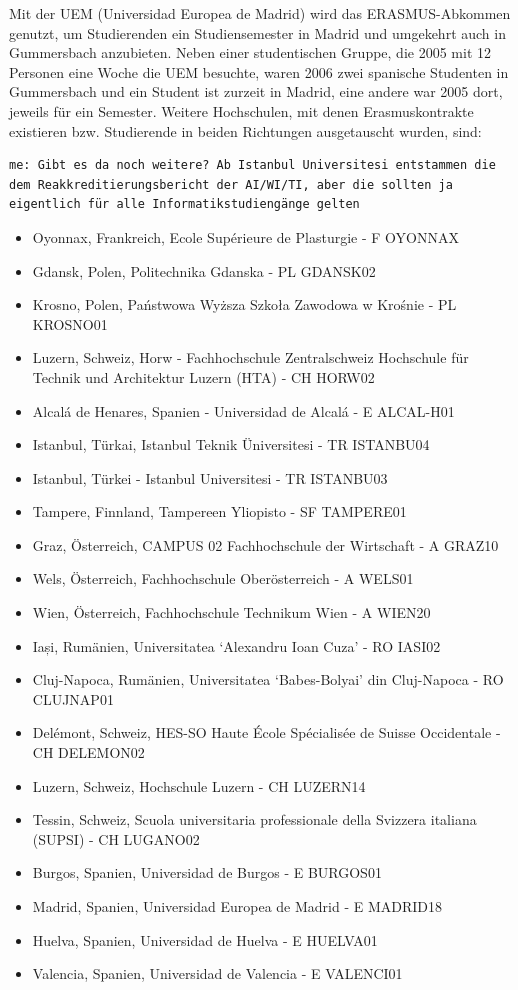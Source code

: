 Mit der UEM (Universidad Europea de Madrid) wird das ERASMUS-Abkommen
genutzt, um Studierenden ein Studiensemester in Madrid und umgekehrt
auch in Gummersbach anzubieten. Neben einer studentischen Gruppe, die
2005 mit 12 Personen eine Woche die UEM besuchte, waren 2006 zwei
spanische Studenten in Gummersbach und ein Student ist zurzeit in
Madrid, eine andere war 2005 dort, jeweils für ein Semester. Weitere
Hochschulen, mit denen Erasmuskontrakte existieren bzw. Studierende in
beiden Richtungen ausgetauscht wurden, sind:

\begin{verbatim}
me: Gibt es da noch weitere? Ab Istanbul Universitesi entstammen die dem Reakkreditierungsbericht der AI/WI/TI, aber die sollten ja eigentlich für alle Informatikstudiengänge gelten
\end{verbatim}

\begin{itemize}
\tightlist
\item
  Oyonnax, Frankreich, Ecole Supérieure de Plasturgie - F OYONNAX
\item
  Gdansk, Polen, Politechnika Gdanska - PL GDANSK02
\item
  Krosno, Polen, Państwowa Wyższa Szkoła Zawodowa w Krośnie - PL
  KROSNO01
\item
  Luzern, Schweiz, Horw - Fachhochschule Zentralschweiz Hochschule für
  Technik und Architektur Luzern (HTA) - CH HORW02
\item
  Alcalá de Henares, Spanien - Universidad de Alcalá - E ALCAL-H01
\item
  Istanbul, Türkai, Istanbul Teknik Üniversitesi - TR ISTANBU04
\item
  Istanbul, Türkei - Istanbul Universitesi - TR ISTANBU03
\item
  Tampere, Finnland, Tampereen Yliopisto - SF TAMPERE01
\item
  Graz, Österreich, CAMPUS 02 Fachhochschule der Wirtschaft - A GRAZ10
\item
  Wels, Österreich, Fachhochschule Oberösterreich - A WELS01
\item
  Wien, Österreich, Fachhochschule Technikum Wien - A WIEN20
\item
  Iași, Rumänien, Universitatea `Alexandru Ioan Cuza' - RO IASI02
\item
  Cluj-Napoca, Rumänien, Universitatea `Babes-Bolyai' din Cluj-Napoca -
  RO CLUJNAP01
\item
  Delémont, Schweiz, HES-SO Haute École Spécialisée de Suisse
  Occidentale - CH DELEMON02
\item
  Luzern, Schweiz, Hochschule Luzern - CH LUZERN14
\item
  Tessin, Schweiz, Scuola universitaria professionale della Svizzera
  italiana (SUPSI) - CH LUGANO02
\item
  Burgos, Spanien, Universidad de Burgos - E BURGOS01
\item
  Madrid, Spanien, Universidad Europea de Madrid - E MADRID18
\item
  Huelva, Spanien, Universidad de Huelva - E HUELVA01
\item
  Valencia, Spanien, Universidad de Valencia - E VALENCI01
\end{itemize}

